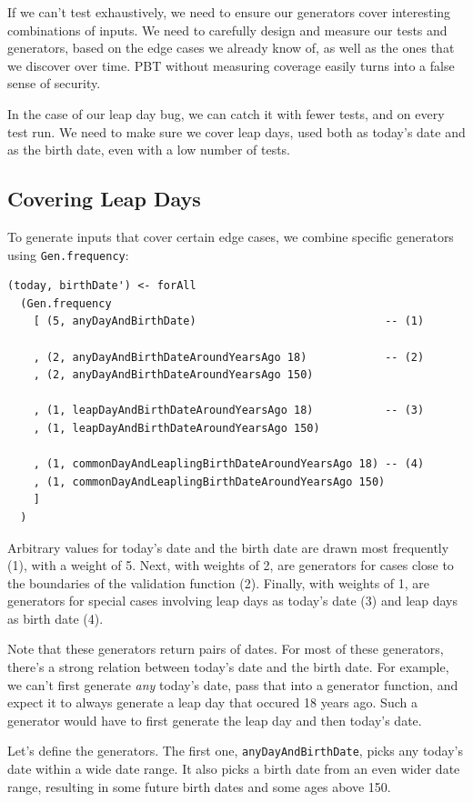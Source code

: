 If we can't test exhaustively, we need to ensure our generators cover
interesting combinations of inputs. We need to carefully design and
measure our tests and generators, based on the edge cases we already
know of, as well as the ones that we discover over time. PBT without
measuring coverage easily turns into a false sense of security.

In the case of our leap day bug, we can catch it with fewer tests, and
on every test run. We need to make sure we cover leap days, used both as
today's date and as the birth date, even with a low number of tests.

\subsection{Covering Leap Days}\label{covering-leap-days}

To generate inputs that cover certain edge cases, we combine specific
generators using \texttt{Gen.frequency}:

\begin{verbatim}
(today, birthDate') <- forAll
  (Gen.frequency
    [ (5, anyDayAndBirthDate)                             -- (1)

    , (2, anyDayAndBirthDateAroundYearsAgo 18)            -- (2)
    , (2, anyDayAndBirthDateAroundYearsAgo 150)

    , (1, leapDayAndBirthDateAroundYearsAgo 18)           -- (3) 
    , (1, leapDayAndBirthDateAroundYearsAgo 150)

    , (1, commonDayAndLeaplingBirthDateAroundYearsAgo 18) -- (4)
    , (1, commonDayAndLeaplingBirthDateAroundYearsAgo 150)
    ]
  )
\end{verbatim}
Arbitrary values for today's date and the birth date are drawn most
frequently (1), with a weight of 5. Next, with weights of 2, are
generators for cases close to the boundaries of the validation function
(2). Finally, with weights of 1, are generators for special cases
involving leap days as today's date (3) and leap days as birth date (4).

Note that these generators return pairs of dates. For most of these
generators, there's a strong relation between today's date and the birth
date. For example, we can't first generate \emph{any} today's date, pass
that into a generator function, and expect it to always generate a leap
day that occured 18 years ago. Such a generator would have to first
generate the leap day and then today's date.

Let's define the generators. The first one, \texttt{anyDayAndBirthDate},
picks any today's date within a wide date range. It also picks a birth
date from an even wider date range, resulting in some future birth dates
and some ages above 150.

